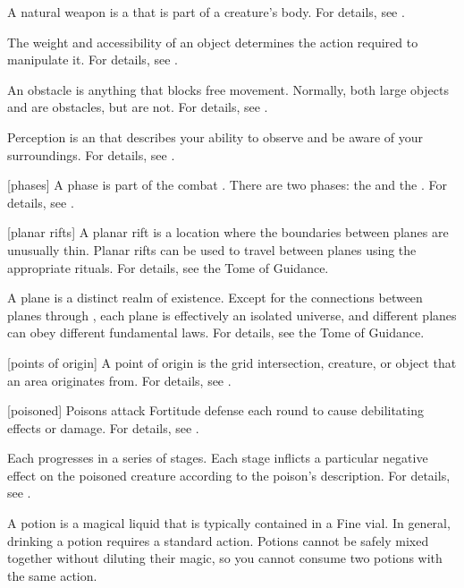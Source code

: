  A natural weapon is a  that is part of a creature's body.
For details, see .

 The weight and accessibility of an object determines the action required to manipulate it.
For details, see .

 An obstacle is anything that blocks free movement.
Normally, both large objects and  are obstacles, but  are not.
For details, see .

 Perception is an  that describes your ability to observe and be aware of your surroundings.
For details, see .

[phases] A phase is part of the combat .
There are two phases: the  and the .
For details, see .

[planar rifts] A planar rift is a location where the boundaries between planes are unusually thin.
Planar rifts can be used to travel between planes using the appropriate rituals.
For details, see the Tome of Guidance.

 A plane is a distinct realm of existence.
Except for the connections between planes through , each plane is effectively an isolated universe, and different planes can obey different fundamental laws.
For details, see the Tome of Guidance.

[points of origin] A point of origin is the grid intersection, creature, or object that an area originates from.
For details, see .

[poisoned] Poisons attack Fortitude defense each round to cause debilitating effects or damage.
For details, see .

 Each  progresses in a series of stages.
Each stage inflicts a particular negative effect on the poisoned creature according to the poison's description.
For details, see .

 A potion is a magical liquid that is typically contained in a Fine vial.
In general, drinking a potion requires a standard action.
Potions cannot be safely mixed together without diluting their magic, so you cannot consume two potions with the same action.

